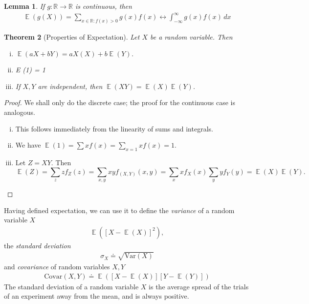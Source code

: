 \documentclass[12pt]{amsbook}
\newcommand{\rr}{\mathbb{R}}
\DeclareMathOperator{\ex}{\mathbb{E}}
\newcommand{\var}{\mathrm{Var}}
\newcommand{\covar}{\mathrm{Covar}}
\theoremstyle{plain}
\newtheorem{theorem}{Theorem}
\newtheorem{lemma}[theorem]{Lemma}
\theoremstyle{definition}
\theoremstyle{remark}
\numberwithin{equation}{section}  %
\numberwithin{equation}{section}  %
\begin{document}
	\begin{lemma}
		If $g: \rr \to \rr$ is continuous, then
		\begin{align*}
			\ex(g(X)) = \sum_{x \in \rr: f(x) > 0} g(x) f(x) \longleftrightarrow
			\int_{-\infty}^{\infty} g(x) f(x) \, dx
		\end{align*}
	\end{lemma}
	\begin{theorem}[Properties of Expectation]
		Let $X$ be a random variable. Then
		\begin{enumerate}[(i)]
			\item $\ex(a X + b Y) = a X(X) + b \ex(Y)$.
			\item E (1) = 1
			\item If $X,Y$ are independent, then $\ex(XY) = \ex(X)\ex(Y)$.
		\end{enumerate}
	\end{theorem}
	\begin{proof}
		We shall only do the discrete case; the proof for the continuous case is
		analogous.
		\begin{enumerate}[(i)]
			\item This follows immediately from the linearity of sums and integrals.
			\item
				We have $\ex(1) = \sum x f(x) = \sum_{x = 1} x f(x) = 1$.
			\item
				Let $Z = XY$. Then
				\[\ex(Z) = \sum_{z} z f_Z(z) = \sum_{x,y} x y f_{(X,Y)}(x,y) = \sum_x 
					x f_X(x)
				\sum_y y f_Y(y) = \ex(X) \ex(Y).\]
		\end{enumerate}
	\end{proof}
	Having defined expectation, we can use it to define the
	\emph{variance} of a random variable $X$
	\begin{align*}
		\ex({[X - \ex(X)]}^2),
	\end{align*}
	the \emph{standard deviation}
	\begin{align*}
		\sigma_X \doteq \sqrt{\var(X)}
	\end{align*}
	and \emph{covariance} of random variables $X, Y$
	\begin{align*}
		\covar(X,Y) \doteq \ex([X - \ex(X)][Y - \ex(Y)])
	\end{align*}
	The standard deviation of a random variable $X$ is the average spread of the
	trials of an experiment away from the mean, and is always positive. 
\end{document}
